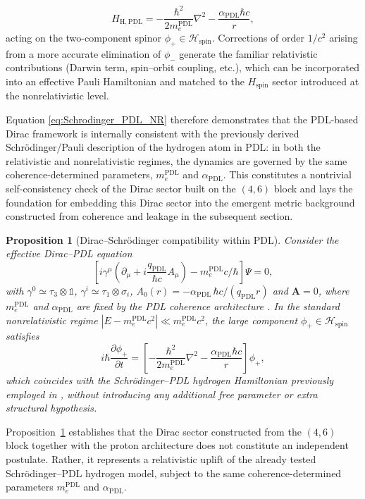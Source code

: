 \documentclass[11pt,a4paper]{article}
\newtheorem{proposition}[theorem]{Proposition}
\theoremstyle{definition}
\newcommand{\PDL}{\mathrm{PDL}}
\newcommand{\Hspin}{\mathcal{H}_{\mathrm{spin}}}
\newcommand{\alphaPDL}{\alpha_{\mathrm{PDL}}}
\begin{document}
\[
H_{\mathrm{H,PDL}} = -\frac{\hbar^2}{2 m_e^{\PDL}} \nabla^2 - \frac{\alphaPDL \hbar c}{r},
\]
acting on the two-component spinor \(\phi_{+}\in\Hspin\). Corrections of order \(1/c^2\) arising from a more accurate elimination of \(\phi_{-}\) generate the familiar relativistic contributions (Darwin term, spin–orbit coupling, etc.), which can be incorporated into an effective Pauli Hamiltonian and matched to the \(H_{\text{spin}}\) sector introduced at the nonrelativistic level.

Equation \eqref{eq:Schrodinger_PDL_NR} therefore demonstrates that the PDL-based Dirac framework is internally consistent with the previously derived Schrödinger/Pauli description of the hydrogen atom in PDL: in both the relativistic and nonrelativistic regimes, the dynamics are governed by the same coherence-determined parameters, $m_e^{\PDL}$ and $\alphaPDL$. This constitutes a nontrivial self-consistency check of the Dirac sector built on the $(4,6)$ block and lays the foundation for embedding this Dirac sector into the emergent metric background constructed from coherence and leakage in the subsequent section.

\begin{proposition}[Dirac–Schrödinger compatibility within PDL]
\label{prop:Dirac_Schrodinger_PDL}
Consider the effective Dirac–PDL equation
\begin{equation}
\left[i\gamma^\mu\left(\partial_\mu + i\frac{q_{\PDL}}{\hbar c} A_\mu\right) - m_e^{\PDL} c/\hbar\right]\Psi = 0,
\end{equation}
with $\gamma^0 \simeq \tau_3 \otimes \mathbb{1}$, $\gamma^i \simeq \tau_1 \otimes \sigma_i$, $A_0(r) = -\alphaPDL\,\hbar c/(q_{\PDL} r)$ and $\mathbf{A}=0$, where $m_e^{\PDL}$ and $\alphaPDL$ are fixed by the PDL coherence architecture \cite{PDL,Derivation_alpha_PDL,Schodinger_PDL}. In the standard nonrelativistic regime $|E - m_e^{\PDL} c^2|\ll m_e^{\PDL} c^2$, the large component $\phi_{+}\in\Hspin$ satisfies
\begin{equation}
i\hbar \frac{\partial \phi_{+}}{\partial t}
=
\left[-\frac{\hbar^2}{2 m_e^{\PDL}} \nabla^2
      - \frac{\alphaPDL \hbar c}{r}\right]\phi_{+},
\end{equation}
which coincides with the Schrödinger–PDL hydrogen Hamiltonian previously employed in \cite{Schodinger_PDL,Sketch_derivation_Schroedinger_PDL}, without introducing any additional free parameter or extra structural hypothesis.
\end{proposition}

\noindent
Proposition~\ref{prop:Dirac_Schrodinger_PDL} establishes that the Dirac sector constructed from the $(4,6)$ block together with the proton architecture does not constitute an independent postulate. Rather, it represents a relativistic uplift of the already tested Schrödinger–PDL hydrogen model, subject to the same coherence-determined parameters $m_e^{\PDL}$ and $\alphaPDL$.
\end{document}
